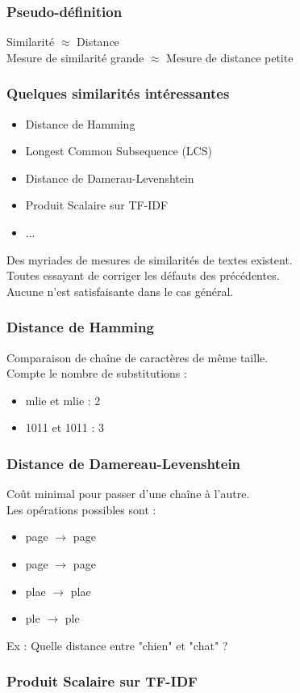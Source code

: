 \begin{frame}
  \frametitle{Pseudo-définition}
  \begin{center}
  Similarité $\approx$ Distance\\
  $\;$\\
  Mesure de similarité grande $\approx$ Mesure de distance petite
  \end{center}
\end{frame}

\begin{frame}
  \frametitle{Quelques similarités intéressantes}
  \begin{itemize}
  \item Distance de Hamming
  \item Longest Common Subsequence (LCS)
  \item Distance de Damerau-Levenshtein
  \item Produit Scalaire sur TF-IDF
  \item ...
  \end{itemize}
  Des myriades de mesures de similarités de textes existent.\\
  Toutes essayant de corriger les défauts des précédentes.\\
  Aucune n'est satisfaisante dans le cas général. 
\end{frame}

\begin{frame}
  \frametitle{Distance de Hamming}
  Comparaison de chaîne de caractères de même taille. \\
  Compte le nombre de substitutions :
  \begin{itemize}
  \item {}mlie et mlie : 2
  \item 1011 et 1011 : 3
  \end{itemize}
\end{frame}

\begin{frame}
  \frametitle{Distance de Damereau-Levenshtein}
  Coût minimal pour passer d'une chaîne à l'autre. \\
  Les opérations possibles sont : 
  \begin{itemize}
  \item {} page $\rightarrow$ page 
  \item {} page $\rightarrow$ page
  \item {} plae $\rightarrow$ plae
  \item {} ple $\rightarrow$ 
  ple
  \end{itemize}
  Ex : Quelle distance entre "chien" et "chat" ? 
\end{frame}

\begin{frame}
  \frametitle{Produit Scalaire sur TF-IDF}
\end{frame}
